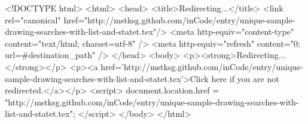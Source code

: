 <!DOCTYPE html>
<html>
<head>
<title>Redirecting...</title>
<link rel="canonical" href="http://mstksg.github.com/inCode/entry/unique-sample-drawing-searches-with-list-and-statet.tex"/>
<meta http-equiv="content-type" content="text/html; charset=utf-8" />
<meta http-equiv="refresh" content="0; url=#{destination_path}" />
</head>
<body>
  <p><strong>Redirecting...</strong></p>
  <p><a href='http://mstksg.github.com/inCode/entry/unique-sample-drawing-searches-with-list-and-statet.tex'>Click here if you are not redirected.</a></p>
  <script>
    document.location.href = "http://mstksg.github.com/inCode/entry/unique-sample-drawing-searches-with-list-and-statet.tex";
  </script>
</body>
</html>
